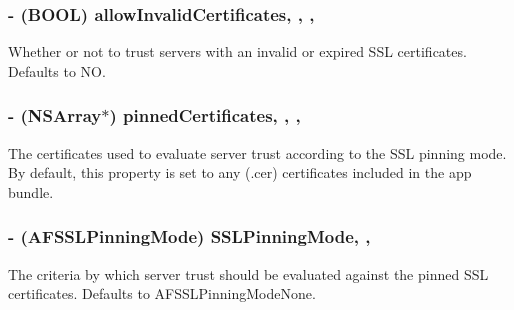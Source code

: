 \subsubsection[{allow\+Invalid\+Certificates}]{\setlength{\rightskip}{0pt plus 5cm}-\/ (B\+O\+O\+L) allow\+Invalid\+Certificates\hspace{0.3cm}{\ttfamily [read]}, {\ttfamily [write]}, {\ttfamily [nonatomic]}, {\ttfamily [assign]}}\label{interface_a_f_security_policy_a4187dab7a2429bd032513b68934837e3}
Whether or not to trust servers with an invalid or expired S\+S\+L certificates. Defaults to {\ttfamily N\+O}. \hypertarget{interface_a_f_security_policy_a1be8462e27228dd5bcff65e96526858a}{}
\subsubsection[{pinned\+Certificates}]{\setlength{\rightskip}{0pt plus 5cm}-\/ (N\+S\+Array$\ast$) pinned\+Certificates\hspace{0.3cm}{\ttfamily [read]}, {\ttfamily [write]}, {\ttfamily [nonatomic]}, {\ttfamily [strong]}}\label{interface_a_f_security_policy_a1be8462e27228dd5bcff65e96526858a}
The certificates used to evaluate server trust according to the S\+S\+L pinning mode. By default, this property is set to any ({\ttfamily .cer}) certificates included in the app bundle. \hypertarget{interface_a_f_security_policy_ae9a77137a0fcecbb05ac30e5e1ce8092}{}
\subsubsection[{S\+S\+L\+Pinning\+Mode}]{\setlength{\rightskip}{0pt plus 5cm}-\/ (A\+F\+S\+S\+L\+Pinning\+Mode) S\+S\+L\+Pinning\+Mode\hspace{0.3cm}{\ttfamily [read]}, {\ttfamily [nonatomic]}, {\ttfamily [assign]}}\label{interface_a_f_security_policy_ae9a77137a0fcecbb05ac30e5e1ce8092}
The criteria by which server trust should be evaluated against the pinned S\+S\+L certificates. Defaults to {\ttfamily A\+F\+S\+S\+L\+Pinning\+Mode\+None}. \hypertarget{interface_a_f_security_policy_a8a87a524e04a9229126490ecfe99dac5}{}
